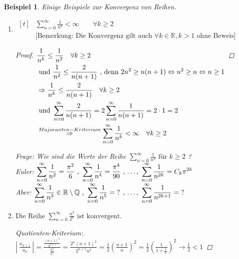 \documentclass[a4paper,titlepage,oneside]{article}
\def\Q{\ensuremath{\mathbb{Q}} }
\def\R{\ensuremath{\mathbb{R}} }
\def\fa{\ensuremath{\forall}}
\def\sp{\hspace{0,1cm}}
\newcommand{\suminf}[2][n]{\ensuremath{\sum_{#1= 0}^{\infty}{#2}}}
\newcommand{\abs}[1]{\ensuremath{\left|\:#1\:\right|}}
\theoremstyle{thmstyle}
\newtheorem{bsp}[satz]{Beispiel}
\theoremstyle{subthmstyle}
\begin{document}
\begin{bsp}
Einige Beispiele zur Konvergenz von Reihen.
\begin{enumerate}
\item %
\begin{math}\displaystyle \begin{aligned}[t]
&\suminf{\frac{1}{n^k}} < \infty \qquad \forall k \ge 2 \\
&\text{[Bemerkung: Die Konvergenz gilt auch \(\fa k \in \R, k > 1\) ohne Beweis]}
\end{aligned}\end{math} 

\begin{proof}
\begin{math}\displaystyle \begin{aligned}[t]
&\frac{1}{n^k} \le \frac{1}{n^2} \quad \forall k \ge 2 \\
&\text{ und } \frac{1}{n^2} \le \frac{2}{n(n+1)} \text{ , denn } 2n^2 \ge n(n+1) \Leftrightarrow n^2 \ge n \Leftrightarrow n \ge 1 \\
&\Rightarrow \frac{1}{n^k} \le \frac{2}{n(n+1)} \quad \forall k \ge 2 \\
&\text{ und } \suminf{\frac{2}{n(n+1)}} = 2 \suminf{\frac{1}{n(n+1)}} = 2 \cdot 1 = 2 \\
&\overset{Majoranten-Kriterium}{\Rightarrow} \suminf{\frac{1}{n^k}} < \infty \quad \forall k \ge 2
\end{aligned}\\\end{math} 
\end{proof}
Frage: Wie sind die Werte der Reihe $\displaystyle \suminf{\frac{1}{n^k}} \text{ für } k \ge 2 $ ? \\
Euler: $ \displaystyle \suminf{\frac{1}{n^2}} = \frac{\pi^2}{6} \text{ , } \suminf{\frac{1}{n^4}} = \frac{\pi^4}{90} \text{ , \dots , } \suminf{\frac{1}{n^{2k}}} = C_k \pi^{2k}$ \\
Aber: $\displaystyle \suminf{\frac{1}{n^3}} \in \R \setminus \Q \text{ , } \suminf{\frac{1}{n^5}} = \text{? } \text{, \dots , } \suminf{\frac{1}{n^{2k+1}}} = \text{? }$

\item
$\displaystyle \text{Die Reihe } \suminf{\frac{n^2}{2^n}} \text{ ist konvergent.}$

\begin{proof}[Quotienten-Kriterium:]\sp\\
\begin{math}\displaystyle
\abs{\frac{a_{n+1}}{a_n}} = \frac{\frac{(n+1)^2}{2^{n+1}}}{\frac{n^2}{2^n}} = \frac{2^n(n+1)^2}{2^{n+1}n^2} = \frac{1}{2} \left(\frac{n+1}{n}\right)^2 = \frac{1}{2} \left(\frac{1}{1+\frac{1}{n}}\right)^2 \longrightarrow \frac{1}{2} < 1
\end{math}
\end{proof}


\end{enumerate}
\end{bsp}
\end{document}
